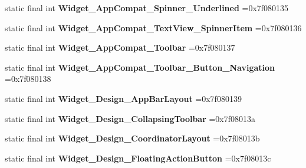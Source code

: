 \begin{DoxyCompactItemize}
\item 
\hypertarget{classcheck_1_1test_1_1_r_1_1style_ac63adcd0c1633cd08775940cb558bbbe}{}static final int {\bfseries Widget\+\_\+\+App\+Compat\+\_\+\+Spinner\+\_\+\+Underlined} =0x7f080135\label{classcheck_1_1test_1_1_r_1_1style_ac63adcd0c1633cd08775940cb558bbbe}

\item 
\hypertarget{classcheck_1_1test_1_1_r_1_1style_a3a074a56ff8e414fb1db4abb124b245e}{}static final int {\bfseries Widget\+\_\+\+App\+Compat\+\_\+\+Text\+View\+\_\+\+Spinner\+Item} =0x7f080136\label{classcheck_1_1test_1_1_r_1_1style_a3a074a56ff8e414fb1db4abb124b245e}

\item 
\hypertarget{classcheck_1_1test_1_1_r_1_1style_aa8a1421e3a3864df1f1a18414a6ce826}{}static final int {\bfseries Widget\+\_\+\+App\+Compat\+\_\+\+Toolbar} =0x7f080137\label{classcheck_1_1test_1_1_r_1_1style_aa8a1421e3a3864df1f1a18414a6ce826}

\item 
\hypertarget{classcheck_1_1test_1_1_r_1_1style_a3da908883e69488640a1b2a976136655}{}static final int {\bfseries Widget\+\_\+\+App\+Compat\+\_\+\+Toolbar\+\_\+\+Button\+\_\+\+Navigation} =0x7f080138\label{classcheck_1_1test_1_1_r_1_1style_a3da908883e69488640a1b2a976136655}

\item 
\hypertarget{classcheck_1_1test_1_1_r_1_1style_abc832c4c81f1290fcec733cd6d9222cb}{}static final int {\bfseries Widget\+\_\+\+Design\+\_\+\+App\+Bar\+Layout} =0x7f080139\label{classcheck_1_1test_1_1_r_1_1style_abc832c4c81f1290fcec733cd6d9222cb}

\item 
\hypertarget{classcheck_1_1test_1_1_r_1_1style_a8804980874e61d66c4cc9a02b5886b8f}{}static final int {\bfseries Widget\+\_\+\+Design\+\_\+\+Collapsing\+Toolbar} =0x7f08013a\label{classcheck_1_1test_1_1_r_1_1style_a8804980874e61d66c4cc9a02b5886b8f}

\item 
\hypertarget{classcheck_1_1test_1_1_r_1_1style_aa62aa7d83255376b25c6817d787c4946}{}static final int {\bfseries Widget\+\_\+\+Design\+\_\+\+Coordinator\+Layout} =0x7f08013b\label{classcheck_1_1test_1_1_r_1_1style_aa62aa7d83255376b25c6817d787c4946}

\item 
\hypertarget{classcheck_1_1test_1_1_r_1_1style_a4b77830a637dba21b308c046d9fb9c3d}{}static final int {\bfseries Widget\+\_\+\+Design\+\_\+\+Floating\+Action\+Button} =0x7f08013c\label{classcheck_1_1test_1_1_r_1_1style_a4b77830a637dba21b308c046d9fb9c3d}


\end{DoxyCompactItemize}

